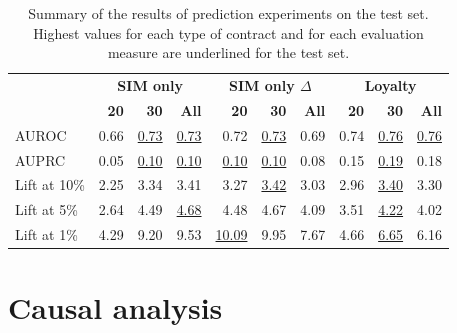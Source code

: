 \begin{table}
    \centering
    \begin{tabular}{lrrrrrrrrr}
        \toprule
        & \multicolumn{3}{c}{\textbf{SIM only}}
        & \multicolumn{3}{c}{\textbf{SIM only $\Delta$}}
        & \multicolumn{3}{c}{\textbf{Loyalty}} \\
        \cmidrule(l){2-4} \cmidrule(l){5-7} \cmidrule(l){8-10}
        & \textbf{20} & \textbf{30} & \textbf{All} & \textbf{20} & \textbf{30} &
        \textbf{All} & \textbf{20} & \textbf{30} & \textbf{All} \\
        \midrule

        AUROC        & 0.66 & \underline{0.73} & \underline{0.73} & 0.72 &
        \underline{0.73} & 0.69 & 0.74 & \underline{0.76} & \underline{0.76} \\

        AUPRC        & 0.05 & \underline{0.10} & \underline{0.10} &
        \underline{0.10} & \underline{0.10} & 0.08 & 0.15 & \underline{0.19} & 0.18 \\

        Lift at 10\% & 2.25 & 3.34 & 3.41 & 3.27 & \underline{3.42} & 3.03 &
        2.96 & \underline{3.40} & 3.30 \\

        Lift at 5\%  & 2.64 & 4.49 & \underline{4.68} & 4.48 & 4.67 & 4.09 &
        3.51 & \underline{4.22} & 4.02 \\

        Lift at 1\%  & 4.29 & 9.20 & 9.53 & \underline{10.09} & 9.95 & 7.67 &
        4.66 & \underline{6.65} & 6.16 \\
        \bottomrule
    \end{tabular}
    \caption{Summary of the results of prediction experiments on the test set.
    Highest values for each type of contract and for each evaluation measure are
    underlined for the test set.}
    \label{tab:results_conclusion}
\end{table}

\section{Causal analysis}

